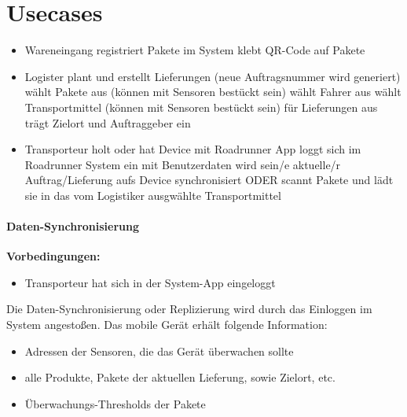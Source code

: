 \section{Usecases}


\begin{itemize}
  \item Wareneingang
  	\subitem registriert Pakete im System
  	\subitem klebt QR-Code auf Pakete

	\item Logister plant und erstellt Lieferungen (neue Auftragsnummer wird
	generiert) \subitem wählt Pakete aus (können mit Sensoren bestückt sein)
		\subitem wählt Fahrer aus 
		\subitem wählt Transportmittel (können mit Sensoren bestückt sein) für
		Lieferungen aus
		\subitem trägt Zielort und Auftraggeber ein
  	
  \item Transporteur
  	\subitem holt oder hat Device mit Roadrunner App
  	\subitem loggt sich im Roadrunner System ein
  		\subsubitem mit Benutzerdaten wird sein/e aktuelle/r Auftrag/Lieferung aufs
  		Device synchronisiert ODER 
  		\subsubitem scannt Pakete und lädt sie in das vom Logistiker ausgwählte
  		Transportmittel
\end{itemize}

\paragraph{Daten-Synchronisierung}
	\textbf{Vorbedingungen: }
	\begin{itemize}
	  \item Transporteur hat sich in der System-App eingeloggt
	\end{itemize}
	
	Die Daten-Synchronisierung oder Replizierung wird durch das Einloggen im
	System angestoßen. Das mobile Gerät erhält folgende Information:
	\begin{itemize}
	  \item Adressen der Sensoren, die das Gerät überwachen sollte
	  \item alle Produkte, Pakete der aktuellen Lieferung, sowie Zielort, etc.
	  \item Überwachungs-Thresholds der Pakete
	\end{itemize}
\par
